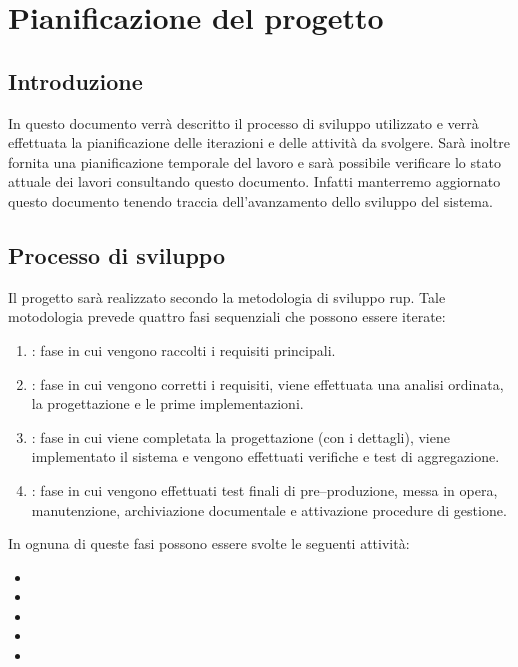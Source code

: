 \chapter{Pianificazione del progetto} 
\label{cha:pianificazione_del_progetto}	

\section{Introduzione}
\label{sec:introduzione}
In questo documento verrà descritto il processo di sviluppo utilizzato e verrà effettuata la pianificazione delle iterazioni e delle attività da svolgere.
Sarà inoltre fornita una pianificazione temporale del lavoro e sarà possibile verificare lo stato attuale dei lavori consultando questo documento. Infatti manterremo aggiornato questo documento tenendo traccia dell'avanzamento dello sviluppo del sistema.

\section{Processo di sviluppo}
\label{sec:processo_di_sviluppo}
Il progetto sarà realizzato secondo la metodologia di sviluppo \gls{rup}.
Tale motodologia prevede quattro fasi sequenziali che possono essere iterate:
\begin{enumerate}
	\item {}: fase in cui vengono raccolti i requisiti principali.

	\item {}: fase in cui vengono corretti i requisiti, viene effettuata una analisi ordinata, la progettazione e le prime implementazioni.

	\item {}: fase in cui viene completata la progettazione (con i dettagli), viene implementato il sistema e vengono effettuati verifiche e test di aggregazione.

	\item {}: fase in cui vengono effettuati test finali di pre--produzione, messa in opera, manutenzione, archiviazione documentale e attivazione procedure di gestione.
\end{enumerate}

\noindent
In ognuna di queste fasi possono essere svolte le seguenti attività:
\begin{itemize}
	\item {}
	\item {}
	\item {}
	\item {}
	\item {}
\end{itemize}

